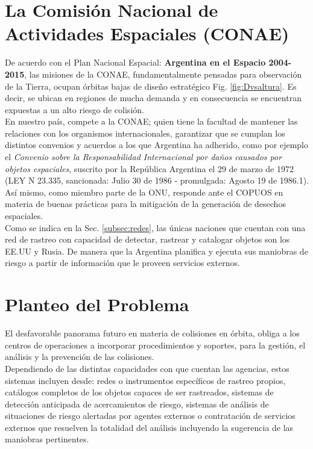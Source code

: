 \section{La Comisi\'on Nacional de Actividades Espaciales (CONAE)}
De acuerdo con el Plan Nacional Espacial: {\bf{ Argentina en el Espacio 2004-2015}}, las misiones de la CONAE, fundamentalmente pensadas para observaci\'on de la Tierra, ocupan \'orbitas bajas de dise\~no estrat\'egico Fig. \ref{fig:Dvsaltura}. Es decir, se ubican en regiones de mucha demanda y en consecuencia se encuentran expuestas a un alto riesgo de colisi\'on.\\
En nuestro pa\'is, compete a la CONAE; quien tiene la facultad de mantener las relaciones con los organismos internacionales, garantizar que se cumplan los distintos convenios y acuerdos a los que Argentina ha adherido, como por ejemplo el {\it{Convenio sobre la Responsabilidad Internacional por da\~nos causados por objetos espaciales}}, suscrito por la Rep\'ublica Argentina el 29 de marzo de 1972 (LEY N 23.335, sancionada: Julio 30 de 1986 - promulgada: Agosto 19 de 1986.1).\\
As\'i mismo, como miembro parte de la ONU, responde ante el COPUOS en materia de buenas pr\'acticas para la mitigaci\'on de la generaci\'on de desechos espaciales.\\

Como se indica en la Sec. \ref{subsec:redes}, las \'unicas naciones que cuentan con una red de rastreo con capacidad de detectar, rastrear y catalogar objetos son los EE.UU y Rusia. De manera que la Argentina planifica y ejecuta sus maniobras de riesgo a partir de informaci\'on que le proveen servicios externos.\\

\section{Planteo del Problema}

El desfavorable panorama futuro en materia de colisiones en \'orbita, obliga a los centros de operaciones a incorporar procedimientos y soportes, para la gesti\'on, el an\'alisis y la prevenci\'on de las colisiones.\\
Dependiendo de las distintas capacidades con que cuentan las agencias, estos sistemas incluyen desde: redes o instrumentos espec\'ificos de rastreo propios, cat\'alogos completos de los objetos capaces de ser rastreados, sistemas de detecci\'on anticipada de acercamientos de riesgo, sistemas de an\'alisis de situaciones de riesgo alertadas por agentes externos o contrataci\'on de servicios externos que resuelven la totalidad del an\'alisis incluyendo la sugerencia de las maniobras pertinentes.\\

